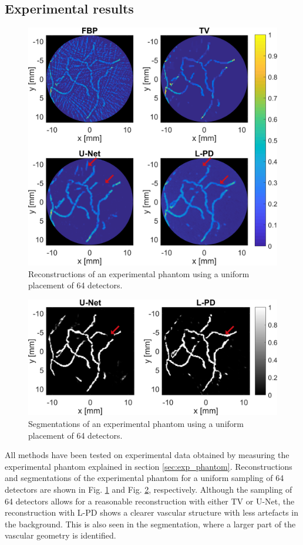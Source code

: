 \documentclass[journal]{IEEEtran}
\begin{document}
\subsection{Experimental results}\vspace{-1mm}
\begin{figure}[ht!]
\centering
\includegraphics[width=\linewidth]{images/paper_exp_uni_recon.png}
\caption{Reconstructions of an experimental phantom using a uniform placement of 64 detectors.}
\label{fig:exp_uni_recon}
\end{figure}
\begin{figure}[ht!]
\centering
\includegraphics[width=\linewidth]{images/paper_exp_uni_segm.png}
\caption{Segmentations of an experimental phantom using a uniform placement of 64 detectors.}
\label{fig:exp_uni_segm}\vspace{-3mm}
\end{figure}
All methods have been tested on experimental data obtained by measuring the experimental phantom explained in section \ref{sec:exp_phantom}. Reconstructions and segmentations of the experimental phantom for a uniform sampling of 64 detectors are shown in Fig. \ref{fig:exp_uni_recon} and Fig. \ref{fig:exp_uni_segm}, respectively. Although the sampling of 64 detectors allows for a reasonable reconstruction with either TV or U-Net, the reconstruction with L-PD shows a clearer vascular structure with less artefacts in the background. This is also seen in the segmentation, where a larger part of the vascular geometry is identified. 
\end{document}
